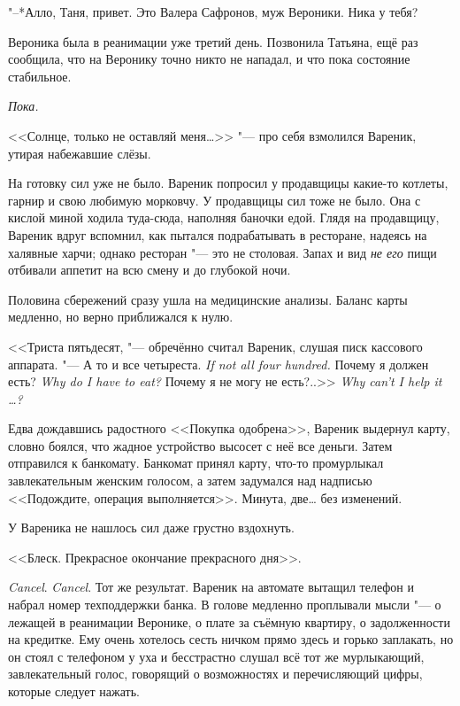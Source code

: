 "--*Алло, Таня, привет.
Это Валера Сафронов, муж Вероники.
Ника у тебя?

\asterism

\textspace

\label{Wed_2012_06_13}

Вероника была в реанимации уже третий день.
Позвонила Татьяна, ещё раз сообщила, что на Веронику точно никто не нападал, и что пока состояние стабильное.

\emph{Пока.}

<<Солнце, только не оставляй меня\ldots{}>> "--- про себя взмолился Вареник, утирая набежавшие слёзы.

На готовку сил уже не было.
Вареник попросил у продавщицы какие-то котлеты, гарнир и свою любимую морковчу.
У продавщицы сил тоже не было.
Она с кислой миной ходила туда-сюда, наполняя баночки едой.
Глядя на продавщицу, Вареник вдруг вспомнил, как пытался подрабатывать в ресторане, надеясь на халявные харчи;
однако ресторан "--- это не столовая.
Запах и вид \emph{не его} пищи отбивали аппетит на всю смену и до глубокой ночи.

Половина сбережений сразу ушла на медицинские анализы.
Баланс карты медленно, но верно приближался к нулю.

<<Триста пятьдесят, "--- обречённо считал Вареник, слушая писк кассового аппарата.
{"--- А то и все четыреста.}
{\textit{If not all four hundred.}}
{Почему я должен есть?}
{\textit{Why do I have to eat?}}
{Почему я не могу не есть?..>>}
{\textit{Why can't I help it \ldots{}?}}

Едва дождавшись радостного <<Покупка одобрена>>, Вареник выдернул карту, словно боялся, что жадное устройство высосет с неё все деньги.
Затем отправился к банкомату.
Банкомат принял карту, что-то промурлыкал завлекательным женским голосом, а затем задумался над надписью <<Подождите, операция выполняется>>.
Минута, две\ldots{} без изменений.

У Вареника не нашлось сил даже грустно вздохнуть.

<<Блеск.
Прекрасное окончание прекрасного дня>>.

\textit{Cancel}.
\textit{Cancel}.
Тот же результат.
Вареник на автомате вытащил телефон и набрал номер техподдержки банка.
В голове медленно проплывали мысли "--- о лежащей в реанимации Веронике, о плате за съёмную квартиру, о задолженности на кредитке.
Ему очень хотелось сесть ничком прямо здесь и горько заплакать, но он стоял с телефоном у уха и бесстрастно слушал всё тот же мурлыкающий, завлекательный голос, говорящий о возможностях и перечисляющий цифры, которые следует нажать.

